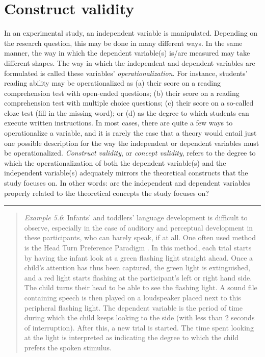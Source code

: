 \documentclass[
]{book}
\begin{document}
\hypertarget{sec:constructvalidity}{%
\section{Construct validity}\label{sec:constructvalidity}}

In an experimental study, an independent variable is manipulated. Depending on the research question, this may be done in many different ways. In the same manner, the way in which the dependent variable(s) is/are measured may take different shapes. The way in which the independent and dependent variables are formulated is called these variables' \emph{operationalization}. For instance, students' reading ability may be operationalized as (a) their score on a reading comprehension test with open-ended questions; (b) their score on a reading comprehension test with multiple choice questions; (c) their score on a so-called cloze test (fill in the missing word); or (d) as the degree to which students can execute written instructions. In most cases, there are quite a few ways to operationalize a variable, and it is rarely the case that a theory would entail just one possible description for the way the independent or dependent variables must be operationalized. \emph{Construct validity}, or \emph{concept validity}, refers to the degree to which the operationalization of both the dependent variable(s) and the independent variable(s) adequately mirrors the theoretical constructs that the study focuses on. In other words: are the independent and dependent variables properly related to the theoretical concepts the study focuses on?

\begin{center}\rule{0.5\linewidth}{0.5pt}\end{center}

\begin{quote}
\emph{Example 5.6}: Infants' and toddlers' language development is difficult to observe, especially in the case of auditory and perceptual development in these participants, who can barely speak, if at all. One often used method is the Head Turn Preference Paradigm \citep{John10}. In this method, each trial starts by having the infant look at a green flashing light straight ahead. Once a child's attention has thus been captured, the green light is extinguished, and a red light starts flashing at the participant's left or right hand side. The child turns their head to be able to see the flashing light. A sound file containing speech is then played on a loudspeaker placed next to this peripheral flashing light. The dependent variable is the period of time during which the child keeps looking to the side (with less than 2 seconds of interruption). After this, a new trial is started. The time spent looking at the light is interpreted as indicating the degree to which the child prefers the spoken stimulus.
\end{quote}
\end{document}
